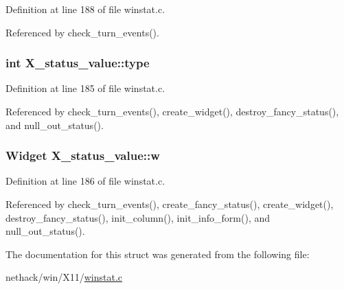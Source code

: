 Definition at line 188 of file winstat.\+c.



Referenced by check\+\_\+turn\+\_\+events().

\hypertarget{structX__status__value_a130c5921a3441f292f2e0ebd789c21fd}{
\subsubsection[{type}]{\setlength{\rightskip}{0pt plus 5cm}int X\+\_\+status\+\_\+value\+::type}}\label{structX__status__value_a130c5921a3441f292f2e0ebd789c21fd}


Definition at line 185 of file winstat.\+c.



Referenced by check\+\_\+turn\+\_\+events(), create\+\_\+widget(), destroy\+\_\+fancy\+\_\+status(), and null\+\_\+out\+\_\+status().

\hypertarget{structX__status__value_a2e5d8f91c202cec7f989cdad7245fdd0}{
\subsubsection[{w}]{\setlength{\rightskip}{0pt plus 5cm}Widget X\+\_\+status\+\_\+value\+::w}}\label{structX__status__value_a2e5d8f91c202cec7f989cdad7245fdd0}


Definition at line 186 of file winstat.\+c.



Referenced by check\+\_\+turn\+\_\+events(), create\+\_\+fancy\+\_\+status(), create\+\_\+widget(), destroy\+\_\+fancy\+\_\+status(), init\+\_\+column(), init\+\_\+info\+\_\+form(), and null\+\_\+out\+\_\+status().



The documentation for this struct was generated from the following file\+:\begin{DoxyCompactItemize}
\item 
nethack/win/\+X11/\hyperlink{winstat_8c}{winstat.\+c}\end{DoxyCompactItemize}
